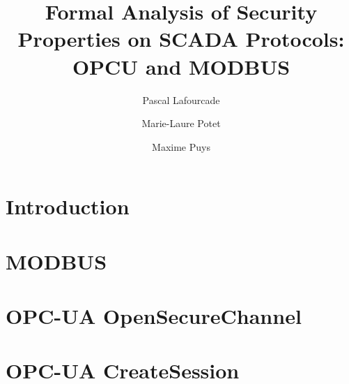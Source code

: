 \documentclass[a4paper, twocolumn]{article}
\title{Formal Analysis of Security Properties on SCADA Protocols: OPCU and MODBUS}
\author{Pascal Lafourcade \and Marie-Laure Potet \and Maxime Puys}
\date{}
\newcommand{\opcua}{OPC-UA\xspace}
\newcommand{\modbus}{MODBUS\xspace}
\begin{document}
\maketitle

\begin{abstract}
\end{abstract}

\section{Introduction}


%
%
%

\section{\modbus}


\section{\opcua OpenSecureChannel}


\section{\opcua CreateSession}

\end{document}
